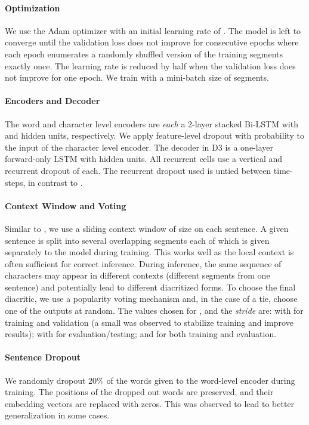 \documentclass[11pt]{article}
\begin{document}
\paragraph{Optimization}
We use the Adam optimizer \cite{adam14} with an initial learning rate of . The model is left to converge until the validation loss does not improve for  consecutive epochs where each epoch enumerates a randomly shuffled version of the training segments exactly once. The learning rate is reduced by half when the validation loss does not improve for one epoch. We train with a mini-batch size of  segments.

\paragraph{Encoders and Decoder}
\label{exp:enc-dec}
The word and character level encoders are \emph{each} a 2-layer stacked Bi-LSTM with  and  hidden units, respectively. We apply feature-level dropout \cite{dropout} with probability  to the input of the character level encoder. The decoder in D3 is a one-layer forward-only LSTM with  hidden units. All recurrent cells use a vertical and recurrent dropout of  each. The recurrent dropout used is untied between time-steps, in contrast to \cite{rec-dropout}.

\paragraph{Context Window and Voting}
\label{exp:voting}
Similar to \cite{mubarak19-highly}, we use a sliding context window of size  on each sentence. A given sentence is split into several overlapping segments each of which is given separately to the model during training. This works well as the local context is often sufficient for correct inference. During inference, the same sequence of characters may appear in different contexts (different segments from one sentence) and potentially lead to different diacritized forms. To choose the final diacritic, we use a popularity voting mechanism and, in the case of a tie, choose one of the outputs at random. The values chosen for ,  and the \textit{stride} are:  with  for training and validation (a small  was observed to stabilize training and improve results);  with  for evaluation/testing; and  for both training and evaluation.

\paragraph{Sentence Dropout}
\label{exp:sdo}
We randomly dropout 20\% of the words given to the word-level encoder during training. The positions of the dropped out words are preserved, and their embedding vectors  are replaced with zeros. This was observed to lead to better generalization in some cases.
\end{document}
